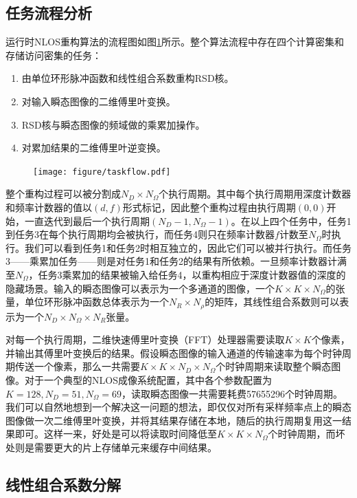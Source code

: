\documentclass[master]{shtthesis}             %
\begin{document}
\subsection{任务流程分析}
运行时NLOS重构算法的流程图如图\ref{fig:tsk_flow}所示。整个算法流程中存在四个计算密集和存储访问密集的任务：
\begin{enumerate}
  \item 由单位环形脉冲函数和线性组合系数重构RSD核。
  \item 对输入瞬态图像的二维傅里叶变换。
  \item RSD核与瞬态图像的频域做的乘累加操作。
  \item 对累加结果的二维傅里叶逆变换。
\end{enumerate}
\begin{figure}[!tb]
    \centering
    \texttt{[image: figure/taskflow.pdf]}
    \label{fig:tsk_flow}
\end{figure}

整个重构过程可以被分割成$N_D\times N_\Omega$个执行周期。其中每个执行周期用深度计数器和频率计数器的值以$(d,f)$形式标记，因此整个重构过程由执行周期$(0,0)$开始，一直迭代到最后一个执行周期$(N_D-1,N_\Omega-1)$。在以上四个任务中，任务1到任务3在每个执行周期均会被执行，而任务4则只在频率计数器$f$计数至$N_\Omega$时执行。我们可以看到任务1和任务2时相互独立的，因此它们可以被并行执行。而任务3——乘累加任务——则是对任务1和任务2的结果有所依赖。一旦频率计数器计满至$N_\Omega$，任务3乘累加的结果被输入给任务4，以重构相应于深度计数器值的深度的隐藏场景。输入的瞬态图像可以表示为一个多通道的图像，一个$K\times K\times N_\Omega$的张量，单位环形脉冲函数总体表示为一个$N_R\times N_\rho$的矩阵，其线性组合系数则可以表示为一个$N_D\times N_\Omega\times N_R$张量。

对每一个执行周期，二维快速傅里叶变换（FFT）处理器需要读取$K\times K$个像素，并输出其傅里叶变换后的结果。假设瞬态图像的输入通道的传输速率为每个时钟周期传送一个像素，那么一共需要$K\times K\times N_D\times N_\Omega$个时钟周期来读取整个瞬态图像。对于一个典型的NLOS成像系统配置\citep{Liu2020}，其中各个参数配置为$K=128, N_D=51, N_\Omega=69$，读取瞬态图像一共需要耗费57655296个时钟周期。我们可以自然地想到一个解决这一问题的想法，即仅仅对所有采样频率点上的瞬态图像做一次二维傅里叶变换，并将其结果存储在本地，随后的执行周期复用这一结果即可。这样一来，好处是可以将读取时间降低至$K\times K\times N_\Omega$个时钟周期，而坏处则是需要更大的片上存储单元来缓存中间结果。

\subsection{线性组合系数分解}
\end{document}
